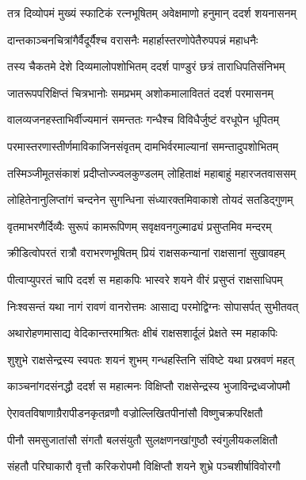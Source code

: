 
\twolineshloka
{तत्र दिव्योपमं मुख्यं स्फाटिकं रत्नभूषितम्}
{अवेक्षमाणो हनुमान् ददर्श शयनासनम्} %

\twolineshloka
{दान्तकाञ्चनचित्रांगैर्वैदूर्यैश्च वरासनैः}
{महार्हास्तरणोपेतैरुपपन्नं महाधनैः} %

\twolineshloka
{तस्य चैकतमे देशे दिव्यमालोपशोभितम्}
{ददर्श पाण्डुरं छत्रं ताराधिपतिसंनिभम्} %

\twolineshloka
{जातरूपपरिक्षिप्तं चित्रभानोः समप्रभम्}
{अशोकमालाविततं ददर्श परमासनम्} %

\twolineshloka
{वालव्यजनहस्ताभिर्वीज्यमानं समन्ततः}
{गन्धैश्च विविधैर्जुष्टं वरधूपेन धूपितम्} %

\twolineshloka
{परमास्तरणास्तीर्णमाविकाजिनसंवृतम्}
{दामभिर्वरमाल्यानां समन्तादुपशोभितम्} %

\twolineshloka
{तस्मिञ्जीमूतसंकाशं प्रदीप्तोज्ज्वलकुण्डलम्}
{लोहिताक्षं महाबाहुं महारजतवाससम्} %

\twolineshloka
{लोहितेनानुलिप्तांगं चन्दनेन सुगन्धिना}
{संध्यारक्तमिवाकाशे तोयदं सतडिद्गुणम्} %

\twolineshloka
{वृतमाभरणैर्दिव्यैः सुरूपं कामरूपिणम्}
{सवृक्षवनगुल्माढ्यं प्रसुप्तमिव मन्दरम्} %

\twolineshloka
{क्रीडित्वोपरतं रात्रौ वराभरणभूषितम्}
{प्रियं राक्षसकन्यानां राक्षसानां सुखावहम्} %

\twolineshloka
{पीत्वाप्युपरतं चापि ददर्श स महाकपिः}
{भास्वरे शयने वीरं प्रसुप्तं राक्षसाधिपम्} %

\twolineshloka
{निःश्वसन्तं यथा नागं रावणं वानरोत्तमः}
{आसाद्य परमोद्विग्नः सोपासर्पत् सुभीतवत्} %

\twolineshloka
{अथारोहणमासाद्य वेदिकान्तरमाश्रितः}
{क्षीबं राक्षसशार्दूलं प्रेक्षते स्म महाकपिः} %

\twolineshloka
{शुशुभे राक्षसेन्द्रस्य स्वपतः शयनं शुभम्}
{गन्धहस्तिनि संविष्टे यथा प्रस्रवणं महत्} %

\twolineshloka
{काञ्चनांगदसंनद्धौ ददर्श स महात्मनः}
{विक्षिप्तौ राक्षसेन्द्रस्य भुजाविन्द्रध्वजोपमौ} %

\twolineshloka
{ऐरावतविषाणाग्रैरापीडनकृतव्रणौ}
{वज्रोल्लिखितपीनांसौ विष्णुचक्रपरिक्षतौ} %

\twolineshloka
{पीनौ समसुजातांसौ संगतौ बलसंयुतौ}
{सुलक्षणनखांगुष्ठौ स्वंगुलीयकलक्षितौ} %

\twolineshloka
{संहतौ परिघाकारौ वृत्तौ करिकरोपमौ}
{विक्षिप्तौ शयने शुभ्रे पञ्चशीर्षाविवोरगौ} %

